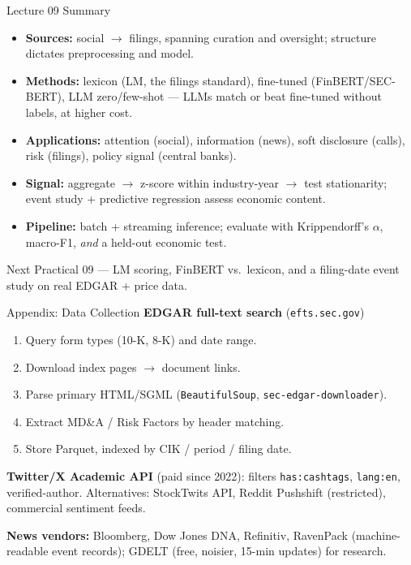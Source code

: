 \documentclass[9pt,t]{beamer}
\begin{document}
\begin{frame}{Lecture 09 Summary}
\begin{itemize}
  \item \textbf{Sources:} social $\to$ filings, spanning curation and oversight;
        structure dictates preprocessing and model.
  \item \textbf{Methods:} lexicon (LM, the filings standard), fine-tuned (FinBERT/SEC-BERT),
        LLM zero/few-shot --- LLMs match or beat fine-tuned without labels, at higher cost.
  \item \textbf{Applications:} attention (social), information (news), soft disclosure
        (calls), risk (filings), policy signal (central banks).
  \item \textbf{Signal:} aggregate $\to$ z-score within industry-year $\to$ test
        stationarity; event study + predictive regression assess economic content.
  \item \textbf{Pipeline:} batch + streaming inference; evaluate with Krippendorff's
        $\alpha$, macro-F1, \emph{and} a held-out economic test.
\end{itemize}

\medskip
\begin{block}{Next}
Practical 09 --- LM scoring, FinBERT vs.\ lexicon, and a filing-date event study
on real EDGAR + price data.
\end{block}
\end{frame}


\begin{frame}[noframenumbering]{Appendix: Data Collection}
\textbf{EDGAR full-text search} (\texttt{efts.sec.gov})
\begin{enumerate}\footnotesize
  \item Query form types (10-K, 8-K) and date range.
  \item Download index pages $\to$ document links.
  \item Parse primary HTML/SGML (\texttt{BeautifulSoup}, \texttt{sec-edgar-downloader}).
  \item Extract MD\&A / Risk Factors by header matching.
  \item Store Parquet, indexed by CIK / period / filing date.
\end{enumerate}

\textbf{Twitter/X Academic API} (paid since 2022): filters \texttt{has:cashtags},
\texttt{lang:en}, verified-author. Alternatives: StockTwits API, Reddit Pushshift
(restricted), commercial sentiment feeds.

\textbf{News vendors:} Bloomberg, Dow Jones DNA, Refinitiv, RavenPack (machine-readable
event records); GDELT (free, noisier, 15-min updates) for research.
\end{frame}
\end{document}
